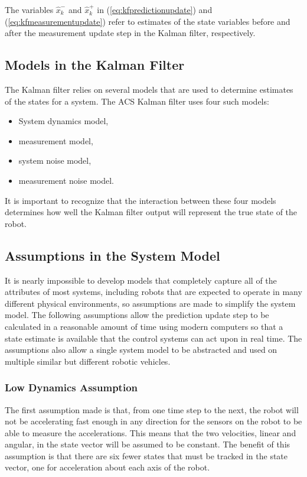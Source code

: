 The variables $\hat{x}_k^-$ and $\hat{x}_k^+$ in (\ref{eq:kfpredictionupdate}) and (\ref{eq:kfmeasurementupdate}) refer to estimates of the state variables before and after the measurement update step in the Kalman filter, respectively.

\subsection{Models in the Kalman Filter}
\label{sec:kfModels}
The Kalman filter relies on several models that are used to determine estimates of the states for a system. The ACS Kalman filter uses four such models:

\begin{itemize}
\item System dynamics model,
\item measurement model,
\item system noise model,
\item measurement noise model.
\end{itemize}

It is important to recognize that the interaction between these four models determines how well the Kalman filter output will represent the true state of the robot.

\subsection{Assumptions in the System Model}
\label{sec:kfAssumptions}
It is nearly impossible to develop models that completely capture all of the attributes of most systems, including robots that are expected to operate in many different physical environments, so assumptions are made to simplify the system model. The following assumptions allow the prediction update step to be calculated in a reasonable amount of time using modern computers so that a state estimate is available that the control systems can act upon in real time. The assumptions also allow a single system model to be abstracted and used on multiple similar but different robotic vehicles.

\subsubsection{Low Dynamics Assumption}
\label{sec:kfLowDynamicsAssumption}
The first assumption made is that, from one time step to the next, the robot will not be accelerating fast enough in any direction for the sensors on the robot to be able to measure the accelerations. This means that the two velocities, linear and angular, in the state vector will be assumed to be constant. The benefit of this assumption is that there are six fewer states that must be tracked in the state vector, one for acceleration about each axis of the robot.

